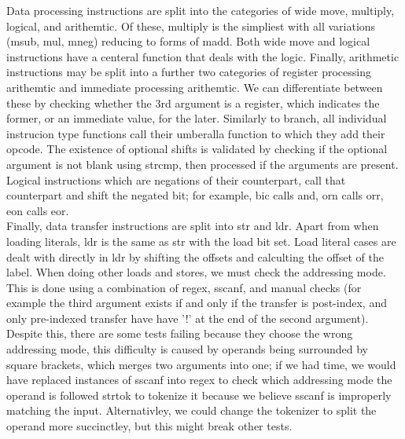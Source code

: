 \documentclass[11pt]{article}
\begin{document}
Data processing instructions are split into the categories of wide move, multiply, logical, and arithemtic. Of these, multiply is the simpliest with all variations (msub, mul, mneg) reducing to forms of madd. Both wide move and logical instructions have a centeral function that deals with the logic. Finally, arithmetic instructions may be split into a further two categories of register processing arithemtic and immediate processing arithemtic. We can differentiate between these by checking whether the 3rd argument is a register, which indicates the former, or an immediate value, for the later. Similarly to branch, all individual instrucion type functions call their umberalla function to which they add their opcode. The existence of optional shifts is validated by checking if the optional argument is not blank using strcmp, then processed if the arguments are present. Logical instructions which are negations of their counterpart, call that counterpart and shift the negated bit; for example, bic calls and, orn calls orr, eon calls eor. \\
Finally, data transfer instructions are split into str and ldr. Apart from when loading literals, ldr is the same as str with the load bit set. Load literal cases are dealt with directly in ldr by shifting the offsets and calculting the offset of the label. When doing other loads and stores, we must check the addressing mode.  This is done using a combination of regex, sscanf, and manual checks (for example the third argument exists if and only if the transfer is post-index, and only pre-indexed transfer have have '!' at the end of the second argument). Despite this, there are some tests failing because they choose the wrong addressing mode, this difficulty is caused by operands being surrounded by square brackets, which merges two arguments into one; if we had time, we would have replaced instances of sscanf into regex to check which addressing mode the operand is followed strtok to tokenize it because we believe sscanf is improperly matching the input. Alternativley, we could change the tokenizer to split the operand more succinctley, but this might break other tests.
\end{document}
